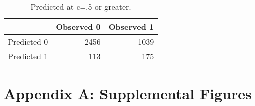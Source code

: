 \documentclass{article}
\begin{document}
\begin{table}[h]
\centering
\begin{tabular}{rrr}
  \hline
 & Observed 0 & Observed 1 \\ 
  \hline
Predicted 0 & 2456 & 1039 \\ 
  Predicted 1 & 113 & 175 \\ 
   \hline
\end{tabular}
\caption{Predicted at c=.5 or greater.} 
\end{table}






\section{Appendix A: Supplemental Figures}
\end{document}
